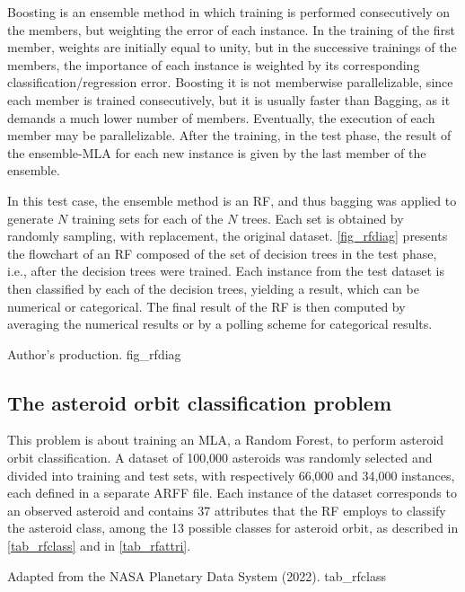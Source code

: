 Boosting \cite {Breiman2001} is an ensemble method in which training is performed consecutively on the members, but weighting the error of each instance. In the training of the first member, weights are initially equal to unity, but in the successive trainings of the members, the importance of each instance is weighted by its corresponding classification/regression error. Boosting it is not memberwise parallelizable, since each member is trained consecutively, but it is usually faster than Bagging, as it demands a much lower number of members. Eventually, the execution of each member may be parallelizable. After the training, in the test phase, the result of the ensemble-MLA for each new instance is given by the last member of the ensemble.

In this test case, the ensemble method is an RF, and thus bagging was applied to generate $N$ training sets for each of the $N$ trees. Each set is obtained by randomly sampling, with replacement, the original dataset. \autoref {fig_rfdiag} presents the flowchart of an RF composed of the set of decision trees in the test phase, i.e., after the decision trees were trained. Each instance from the test dataset is then classified by each of the decision trees, yielding a result, which can be numerical or categorical. The final result of the RF is then computed by averaging the numerical results or by a polling scheme for categorical results. 

     {Author's production.} {fig_rfdiag}

%
%
%
\subsection {The asteroid orbit classification problem} %

This problem is about training an MLA, a Random Forest, to perform asteroid orbit classification. A dataset of 100,000 asteroids was randomly selected and divided into training and test sets, with respectively 66,000 and 34,000 instances, each defined in a separate ARFF file. Each instance of the dataset corresponds to an observed asteroid and contains 37 attributes that the RF employs to classify the asteroid class, among the 13 possible classes for asteroid orbit, as described in \autoref {tab_rfclass} and in \autoref {tab_rfattri}.  

     {Adapted from the NASA Planetary Data System (2022).} {tab_rfclass}

